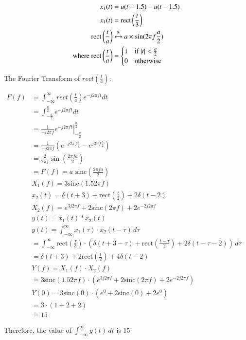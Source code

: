 \documentclass[journal,12pt,onecolumn]{IEEEtran}
\theoremstyle{remark}
\begin{document}
\begin{align}
x_1(t) &= u(t+1.5) - u(t-1.5) \\
x_1(t) &= \text{rect}\left(\frac{t}{3}\right) \\
\text{rect}\left(\frac{t}{a}\right) &\xleftrightarrow{\mathcal{F}} a \times \sin(2\pi f \frac{a}{2}) \\
\text{where } \text{rect}\left(\frac{t}{a}\right) &= \begin{cases}
1 & \text{if } |t| < \frac{a}{2} \\
0 & \text{otherwise}
\end{cases}
\end{align}


The Fourier Transform of $rect\left(\frac{t}{a}\right)$:

\begin{align}
F(f) &= \int_{-\infty}^{\infty} rect\left(\frac{t}{a}\right) e^{-j2\pi f t} dt \\
&= \int_{-\frac{a}{2}}^{\frac{a}{2}} e^{-j2\pi f t} dt \\
&= \left. \frac{1}{-i2\pi f} e^{-j2\pi f t} \right|_{-\frac{a}{2}}^{\frac{a}{2}} \\
&= \frac{1}{-j2\pi f} (e^{-j2\pi f \frac{a}{2}} - e^{j2\pi f \frac{a}{2}}) \\
&= \frac{2}{2\pi f} \sin\left(\frac{2\pi f a}{2}\right)\\
&=\boxed{F(f) = a \text{ sinc}\left(\frac{2\pi f a}{2}\right)}\\
& X_1(f)=3\text{sinc}(1.5 2\pi f) & \\
& x_2(t) = \delta(t+3) + \text{rect}\left(\frac{t}{2}\right) + 2\delta(t-2) & \\
& X_2(f) = e^{3j2\pi f} + 2\text{sinc}(2\pi f) + 2e^{-2j2\pi f} & \\
& y(t) = x_1(t) * x_2(t) \\
& y(t)= \int_{-\infty}^{\infty} x_1(\tau) \cdot x_2(t - \tau) \, d\tau \\
&= \int_{-\infty}^{\infty} \text{rect}\left(\frac{\tau}{3}\right) \cdot \left( \delta(t+3-\tau) + \text{rect}\left(\frac{t-\tau}{2}\right) + 2\delta(t-\tau-2) \right) \, d\tau \\
&= \delta(t+3) + 2\text{rect}\left(\frac{t}{2}\right) + 4\delta(t-2)\\
& Y(f) = X_1(f) \cdot X_2(f) \\
&= 3\text{sinc}(1.5 2\pi f) \cdot (e^{3j2\pi f} + 2\text{sinc}(2\pi f) + 2e^{-2j2\pi f})\\
& Y(0)= 3\text{sinc}(0) \cdot (e^{0} + 2\text{sinc}(0) + 2e^{0}) \\
&= 3\cdot (1 + 2 + 2) \\
&= 15
\end{align}

Therefore, the value of $\int_{-\infty}^{\infty} y(t) \, dt$ is $15$
\end{document}
